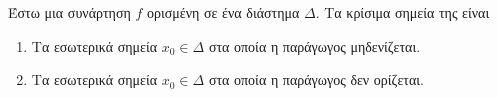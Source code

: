 Έστω μια συνάρτηση $ f $ ορισμένη σε ένα διάστημα $ \Delta $. Τα κρίσιμα σημεία της είναι
\begin{enumerate}
\item Τα εσωτερικά σημεία $ x_0\in\Delta $ στα οποία η παράγωγος μηδενίζεται.
\item Τα εσωτερικά σημεία $ x_0\in\Delta $ στα οποία η παράγωγος δεν ορίζεται.
\end{enumerate}

